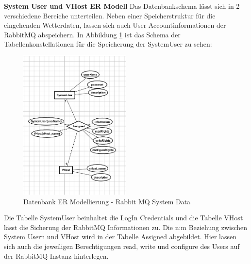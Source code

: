 \textbf{System User und VHost ER Modell}
Das Datenbankschema lässt sich in 2 verschiedene Bereiche unterteilen. Neben einer Speicherstruktur für die eingehenden Wetterdaten, lassen sich auch User Accountinformationen der RabbitMQ abspeichern. In Abbildung \ref{img:DBSchemaSystemUser} ist das Schema der Tabellenkonstellationen für die Speicherung der SystemUser zu sehen: 
\begin{figure}[htbp]
	\centering
	\includegraphics[width=0.5\textwidth]{Bilder/DBSchemaSystemUser.png}
	\caption{Datenbank ER Modellierung - Rabbit MQ System Data}
	\label{img:DBSchemaSystemUser}
\end{figure} 
Die Tabelle SystemUser  beinhaltet die LogIn Credentials und die Tabelle VHost lässt die Sicherung der RabbitMQ Informationen zu. 
Die n:m Beziehung zwischen System Usern und VHost wird in der Tabelle Assigned abgebildet. Hier lassen sich auch die jeweiligen Berechtigungen read, write und configure des Users auf der RabbitMQ Instanz hinterlegen.

